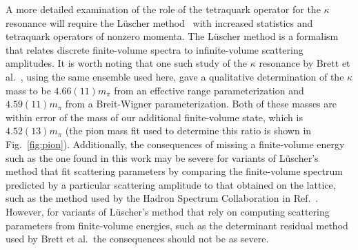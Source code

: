 A more detailed examination of the role of the tetraquark operator for the $\kappa$ resonance will require the L\"uscher method~\cite{Luscher:1990ck} with increased statistics and tetraquark operators of nonzero momenta. The L\"uscher method is a formalism that relates discrete finite-volume spectra to infinite-volume scattering amplitudes. It is worth noting that one such study of the $\kappa$ resonance by Brett et al.~\cite{Brett:2018jqw}, using the same ensemble used here, gave a qualitative determination of the $\kappa$ mass to be $4.66(11)m_\pi$ from an effective range parameterization and $4.59(11)m_\pi$ from  a Breit-Wigner parameterization. Both of these masses are within error of the mass of our additional finite-volume state, which is $4.52(13)m_\pi$ (the pion mass fit used to determine this ratio is shown in Fig.~\ref{fig:pion}). Additionally, the consequences of missing a finite-volume energy such as the one found in this work may be severe for variants of L\"uscher's method that fit scattering parameters by comparing the finite-volume spectrum predicted by a particular scattering amplitude to that obtained on the lattice, such as the method used by the Hadron Spectrum Collaboration in Ref.~\cite{Wilson:2015dqa}. However, for variants of L\"uscher's method that rely on computing scattering parameters from finite-volume energies, such as the determinant residual method~\cite{Morningstar:2017spu} used by Brett et al.\, the consequences should not be as severe.

